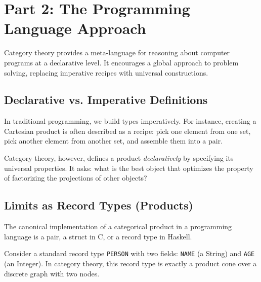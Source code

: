 \documentclass{article}
\begin{document}
\section{Part 2: The Programming Language Approach}
Category theory provides a meta-language for reasoning about computer programs at a declarative level. It encourages a global approach to problem solving, replacing imperative recipes with universal constructions.

\subsection{Declarative vs. Imperative Definitions}
In traditional programming, we build types imperatively. For instance, creating a Cartesian product is often described as a recipe: pick one element from one set, pick another element from another set, and assemble them into a pair. 

Category theory, however, defines a product \textit{declaratively} by specifying its universal properties. It asks: what is the best object that optimizes the property of factorizing the projections of other objects?

\subsection{Limits as Record Types (Products)}
The canonical implementation of a categorical product in a programming language is a pair, a struct in C, or a record type in Haskell. 

Consider a standard record type \texttt{PERSON} with two fields: \texttt{NAME} (a String) and \texttt{AGE} (an Integer). In category theory, this record type is exactly a product cone over a discrete graph with two nodes. 

\begin{center}
\end{center}
\end{document}
